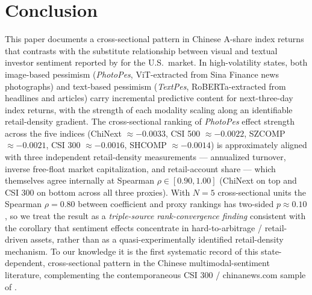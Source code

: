 \documentclass[AER]{AEA}
\begin{document}
\section{Conclusion}

This paper documents a cross-sectional pattern in Chinese A-share index returns that contrasts with the substitute relationship between visual and textual investor sentiment reported by \citet{obaid2022picture} for the U.S.\ market. In high-volatility states, both image-based pessimism (\textit{PhotoPes}, ViT-extracted from Sina Finance news photographs) and text-based pessimism (\textit{TextPes}, RoBERTa-extracted from headlines and articles) carry incremental predictive content for next-three-day index returns, with the strength of each modality scaling along an identifiable retail-density gradient. The cross-sectional ranking of \textit{PhotoPes} effect strength across the five indices (ChiNext $\approx -0.0033$, CSI 500 $\approx -0.0022$, SZCOMP $\approx -0.0021$, CSI 300 $\approx -0.0016$, SHCOMP $\approx -0.0014$) is approximately aligned with three independent retail-density measurements --- annualized turnover, inverse free-float market capitalization, and retail-account share --- which themselves agree internally at Spearman $\rho \in [0.90, 1.00]$ (ChiNext on top and CSI 300 on bottom across all three proxies). With $N=5$ cross-sectional units the Spearman $\rho = 0.80$ between coefficient and proxy rankings has two-sided $p \approx 0.10$, so we treat the result as a \emph{triple-source rank-convergence finding} consistent with the \citet{baker2007investor} corollary that sentiment effects concentrate in hard-to-arbitrage / retail-driven assets, rather than as a quasi-experimentally identified retail-density mechanism. To our knowledge it is the first systematic record of this state-dependent, cross-sectional pattern in the Chinese multimodal-sentiment literature, complementing the contemporaneous CSI 300 / chinanews.com sample of \citet{zhang2025multimodal}.
\end{document}
